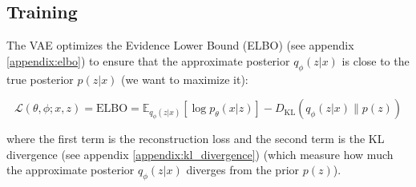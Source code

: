 \subsection{Training}

The VAE optimizes the Evidence Lower Bound (ELBO) (see appendix \ref{appendix:elbo}) to ensure that the approximate posterior $q_\phi (z|x)$ is close to the true posterior $p(z|x)$ (we want to maximize it):

\begin{equation}
    \mathcal{L}(\theta, \phi; x, z) = \text{ELBO} = \mathbb{E}_{q_\phi(z|x)} \left[ \log p_\theta(x|z) \right] - D_\text{KL}(q_\phi(z|x) \| p(z))
    \label{eq:vae_elbo}
\end{equation}

where the first term is the reconstruction loss and the second term is the KL divergence (see appendix \ref{appendix:kl_divergence}) (which measure how much the approximate posterior $q_\phi (z|x)$ diverges from the prior $p(z)$). 